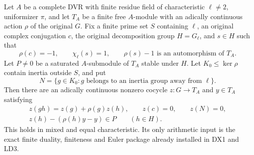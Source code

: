 \begin{theorem}
\label{claim:IX5}
Let $A$ be a complete DVR with finite residue field of
characteristic $\ell\ne2$, uniformizer $\pi$, and let $T_A$
be a finite free $A$-module with an adically continuous
action $\rho$ of the original $G$.
Fix a finite prime set $S$ containing $\ell$, an original
complex conjugation $c$, the original decomposition group
$H=G_\ell$, and $s\in H$ such that
\[
 \rho(c)=-1,\qquad \chi_\ell(s)=1,\qquad
                       \rho(s)-1\text{ is an automorphism of }T_A.
 \tag{IX.9}
\]
Let $P\ne0$ be a saturated $A$-submodule of $T_A$ stable
under $H$.  Let $K_0\le\ker\rho$ contain inertia outside
$S$, and put
\[
 N=\{g\in K_0:g\text{ belongs to an inertia group away from }\ell\}.
 \tag{IX.10}
\]
Then there are an adically continuous nonzero cocycle
$z:G\to T_A$ and $y\in T_A$ satisfying
\[
 \begin{gathered}
 z(gh)=z(g)+\rho(g)z(h),\qquad z(c)=0,
                  \qquad z(N)=0,\\
 z(h)-(\rho(h)y-y)\in P\qquad(h\in H).
 \end{gathered}
 \tag{IX.11}
\]
This holds in mixed and equal characteristic.  Its only
arithmetic input is the exact finite duality, finiteness
and Euler package already installed in DX1 and LD3.
\end{theorem}

